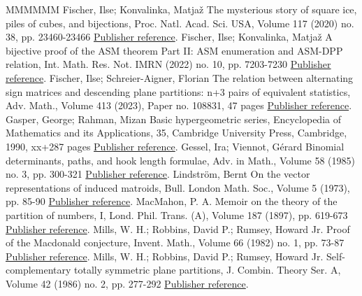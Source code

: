 \begin{thebibliography}{MMMMMM}
 Fischer, Ilse; Konvalinka, Matjaž The mysterious story of square ice, piles of cubes, and bijections, Proc. Natl. Acad. Sci. USA, Volume 117 (2020) no. 38, pp. 23460-23466 \href{https://alco.centre-mersenne.org/articles/10.5802/alco.374/#cube}{Publisher reference}.
 Fischer, Ilse; Konvalinka, Matjaž A bijective proof of the ASM theorem Part II: ASM enumeration and ASM-DPP relation, Int. Math. Res. Not. IMRN (2022) no. 10, pp. 7203-7230 \href{https://alco.centre-mersenne.org/articles/10.5802/alco.374/#FischerKonvalinka20plus}{Publisher reference}.
 Fischer, Ilse; Schreier-Aigner, Florian The relation between alternating sign matrices and descending plane partitions: n+3 pairs of equivalent statistics, Adv. Math., Volume 413 (2023), Paper no. 108831, 47 pages \href{https://alco.centre-mersenne.org/articles/10.5802/alco.374/#FischerSchreierAigner23}{Publisher reference}.
 Gasper, George; Rahman, Mizan Basic hypergeometric series, Encyclopedia of Mathematics and its Applications, 35, Cambridge University Press, Cambridge, 1990, xx+287 pages \href{https://alco.centre-mersenne.org/articles/10.5802/alco.374/#GasperRahman90}{Publisher reference}.
 Gessel, Ira; Viennot, Gérard Binomial determinants, paths, and hook length formulae, Adv. in Math., Volume 58 (1985) no. 3, pp. 300-321 \href{https://alco.centre-mersenne.org/articles/10.5802/alco.374/#GesselViennot85}{Publisher reference}.
 Lindström, Bernt On the vector representations of induced matroids, Bull. London Math. Soc., Volume 5 (1973), pp. 85-90 \href{https://alco.centre-mersenne.org/articles/10.5802/alco.374/#Lindstroem73}{Publisher reference}.
 MacMahon, P. A. Memoir on the theory of the partition of numbers, I, Lond. Phil. Trans. (A), Volume 187 (1897), pp. 619-673 \href{https://alco.centre-mersenne.org/articles/10.5802/alco.374/#MacMahon97}{Publisher reference}.
 Mills, W. H.; Robbins, David P.; Rumsey, Howard Jr. Proof of the Macdonald conjecture, Invent. Math., Volume 66 (1982) no. 1, pp. 73-87 \href{https://alco.centre-mersenne.org/articles/10.5802/alco.374/#MillsRobbinsRumsey82}{Publisher reference}.
 Mills, W. H.; Robbins, David P.; Rumsey, Howard Jr. Self-complementary totally symmetric plane partitions, J. Combin. Theory Ser. A, Volume 42 (1986) no. 2, pp. 277-292 \href{https://alco.centre-mersenne.org/articles/10.5802/alco.374/#MillsRobbinsRumsey86}{Publisher reference}.

\end{thebibliography}

